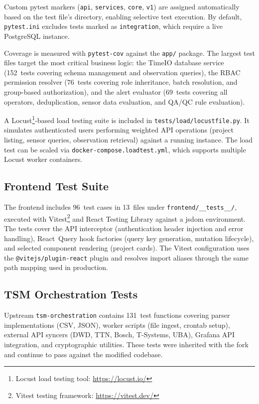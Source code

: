 Custom pytest markers (\texttt{api}, \texttt{services}, \texttt{core}, \texttt{v1}) are
assigned automatically based on the test file's directory, enabling selective test execution.
By default, \texttt{pytest.ini} excludes tests marked as
\texttt{integration}, which require a live PostgreSQL instance.

Coverage is measured with \texttt{pytest-cov} against the \texttt{app/} package. The
largest test files target the most critical business logic: the TimeIO database service
(152~tests covering schema management and observation queries), the RBAC permission resolver
(76~tests covering role inheritance, batch resolution, and group-based authorization),
and the alert evaluator (69~tests covering all operators, deduplication, sensor data
evaluation, and QA/QC rule evaluation).

A Locust\footnote{Locust load testing tool: \url{https://locust.io/}}-based load testing suite is included in \texttt{tests/load/locustfile.py}. It
simulates authenticated users performing weighted API operations (project listing, sensor
queries, observation retrieval) against a running instance. The load test can be scaled
via \texttt{docker-compose.loadtest.yml}, which supports multiple Locust worker containers.

\subsection{Frontend Test Suite}
\label{sec:test-approach-frontend}

The frontend includes 96~test cases in 13~files under \texttt{frontend/\_\_tests\_\_/},
executed with Vitest\footnote{Vitest testing framework: \url{https://vitest.dev/}} and React Testing Library against a jsdom environment. The tests cover
the API interceptor (authentication header injection and error handling), React~Query hook
factories (query key generation, mutation lifecycle), and selected component rendering
(project cards). The Vitest configuration uses the \texttt{@vitejs/plugin-react} plugin
and resolves import aliases through the same path mapping used in production.

\subsection{TSM Orchestration Tests}
\label{sec:test-approach-tsm}

Upstream \texttt{tsm-orchestration} contains 131~test functions covering
parser implementations (CSV, JSON), worker scripts (file ingest, crontab setup), external
API syncers (DWD, TTN, Bosch, T-Systems, UBA), Grafana API integration, and cryptographic
utilities. These tests were inherited with the fork and continue to pass against the
modified codebase.

